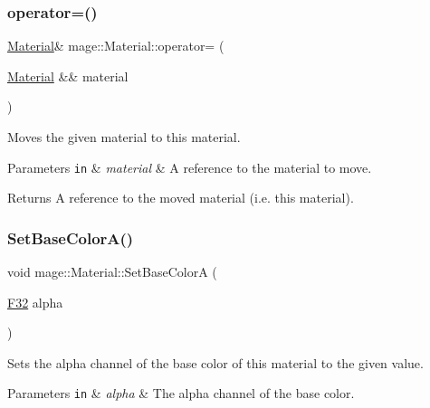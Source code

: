 \subsubsection{\texorpdfstring{operator=()}{operator=()}\hspace{0.1cm}{\footnotesize\ttfamily [2/2]}}
{\footnotesize\ttfamily \hyperlink{structmage_1_1_material}{Material}\& mage\+::\+Material\+::operator= (\begin{DoxyParamCaption}\item[{\hyperlink{structmage_1_1_material}{Material} \&\&}]{material }\end{DoxyParamCaption})\hspace{0.3cm}{\ttfamily [default]}}

Moves the given material to this material.


\begin{DoxyParams}[1]{Parameters}
\mbox{\tt in}  & {\em material} & A reference to the material to move. \\
\hline
\end{DoxyParams}
\begin{DoxyReturn}{Returns}
A reference to the moved material (i.\+e. this material). 
\end{DoxyReturn}
\hypertarget{structmage_1_1_material_a0acb6bb48a964d61199cf0f022e900fa}{}\label{structmage_1_1_material_a0acb6bb48a964d61199cf0f022e900fa} 
\subsubsection{\texorpdfstring{Set\+Base\+Color\+A()}{SetBaseColorA()}}
{\footnotesize\ttfamily void mage\+::\+Material\+::\+Set\+Base\+ColorA (\begin{DoxyParamCaption}\item[{\hyperlink{namespacemage_aa97e833b45f06d60a0a9c4fc22ae02c0}{F32}}]{alpha }\end{DoxyParamCaption})\hspace{0.3cm}{\ttfamily [noexcept]}}

Sets the alpha channel of the base color of this material to the given value.


\begin{DoxyParams}[1]{Parameters}
\mbox{\tt in}  & {\em alpha} & The alpha channel of the base color. \\
\hline
\end{DoxyParams}
\hypertarget{structmage_1_1_material_a703b29a7e0d31afe7781765ec6ea172e}{}\label{structmage_1_1_material_a703b29a7e0d31afe7781765ec6ea172e} 
